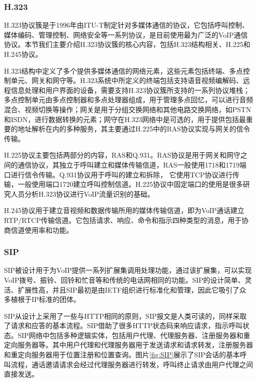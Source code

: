 \subsubsection{H.323}
H.323协议簇是于1996年由ITU-T制定针对多媒体通信的协议，它包括呼叫控制、媒体编码、管理控制、网络安全等一系列协议，是目前使用最为广泛的VoIP通信协议。本节我们主要介绍H.323协议簇的核心内容，包括H.323结构相关、H.225和H.245协议。

H.323结构中定义了多个提供多媒体通信的网络元素，这些元素包括终端、多点控制单元、网关和网守等。H.323系统中所定义的终端包括支持语音视频编解码、远程信息处理和用户界面的设备，需要支持H.323协议簇所支持的一系列协议堆栈；多点控制单元由多点控制器和多点处理器组成，用于管理多点回忆，可以进行音频混合、视频切换等操作；网关是用于分组交换网络和其他电路交换网络，如PSTN和ISDN，进行数据转换的元素；网守在H.323网络中是可选的，用于提供包括最重要的地址解析在内的多种服务，其主要通过H.225中的RAS协议实现与网关的信令传输。

H.225协议主要包括两部分的内容，RAS和Q.931。RAS协议是用于网关和网守之间的通信协议，其独立于呼叫建立和媒体传输信道，RAS一般使用1718和1719端口进行信令传输。Q.931协议用于呼叫的建立和拆除， 它使用TCP协议进行传输，一般使用端口1720建立呼叫控制信道。H.225协议中固定端口的使用是很多研究人员分析H.323协议进行VoIP流量识别的基础。

H.245协议用于建立音视频和数据传输所用的媒体传输信道，即为VoIP通话建立RTP/RTCP传输信道。它包括请求、响应、命令和指示四种类型的消息，用于协商信道使用率和功能。


\subsubsection{SIP}
SIP被设计用于为VoIP提供一系列扩展集调用处理功能，通过该扩展集，可以实现VoIP拨号、振铃、回铃和忙音等和传统的电话网相同的功能。SIP的设计简单、灵活、扩展性高，并且SIP最初是由IETF组织进行标准化和管理，因此它吸引了众多植根于IP标准的团体。

SIP从设计上采用了一些与HTTP相同的原则，SIP报文是人类可读的，同样采取了请求和应答的基本流程。SIP借助了很多HTTP状态码来响应请求，指示呼叫状态。SIP网络中包括多种逻辑实体，包括用户代理、代理服务器、注册服务器和重定向服务器等。其中用户代理和代理服务器用于发送请求和请求转发，注册服务器和重定向服务器用于位置注册和位置查询。图片\ref{fig:SIP}展示了SIP会话的基本呼叫流程，通话邀请请求会经过代理服务器进行转发，呼叫终止请求由用户代理之间直接发送。

